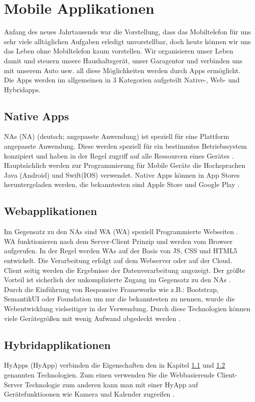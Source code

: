 \newpage

\section{Mobile Applikationen}
Anfang des neues Jahrtausends war die Vorstellung, dass das Mobiltelefon für uns sehr viele alltäglichen Aufgaben erledigt unvorstellbar, doch heute können wir uns das Leben ohne 
Mobiltelefon kaum vorstellen.
Wir organisieren unser Leben damit und steuern unsere Haushaltsgerät, unser Garagentor und verbinden uns mit unserem Auto usw. all diese Möglichkeiten werden durch Apps ermöglicht.
Die Apps werden im allgemeinen in 3 Kategorien aufgeteilt
Native-, Web- und Hybridapps. 

\subsection{Native Apps}\label{chap:Native Apps}
\acl{NA}s (NA) (deutsch; angepasste Anwendung) ist speziell für eine Plattform angepasste Anwendung. 
Diese werden speziell für ein bestimmtes Betriebssystem konzipiert und haben in der Regel zugriff auf alle Ressourcen eines Gerätes \cite{NativeApp}.
Hauptsächlich werden zur Programmierung für Mobile Geräte die Hochsprachen Java (Android) und Swift(IOS) verwendet. Native Apps können in App Stores heruntergeladen  werden, die bekanntesten sind Apple Store und Google Play \cite{Hochsprachen}.

\subsection{Webapplikationen}\label{chap:Webapplikationen}
Im Gegensatz zu den \acs{NA}s sind \acl{WA} (\acs{WA}) speziell Programmierte Webseiten \cite{Hochsprachen}.
\acs{WA} funktionieren nach dem Server-Client Prinzip und werden vom Browser aufgerufen. In der Regel werden \acs{WA}s auf der Basis von \acs{JS}, \acs{CSS} und \acs{HTML5} entwickelt. Die Verarbeitung erfolgt auf dem Webserver oder auf der Cloud. 
Client seitig werden die Ergebnisse der Datenverarbeitung angezeigt. Der größte Vorteil ist sicherlich der unkomplizierte Zugang im Gegensatz zu den \acs{NA}s \cite{WebApps}.
Durch die Einführung von Responsive Frameworks wie z.B.: Bootstrap, SemantikUI oder Foundation um nur die bekanntesten zu nennen, wurde die Webentwicklung vielseitiger in der Verwendung. Durch diese Technologien können viele Gerätegrößen mit wenig Aufwand abgedeckt werden \cite{CSS}. 

\subsection{Hybridapplikationen}
\acl{HyApp}s (\acs{HyApp}) verbinden die Eigenschaften den in Kapitel \ref{chap:Native Apps} und \ref{chap:Webapplikationen} genannten Technologien. Zum einen verwenden Sie die Webbasierende Client-Server Technologie zum anderen kann man mit einer \acs{HyApp} auf Gerätefunktioonen wie Kamera und Kalender zugreifen \cite{HybridApps}. 


